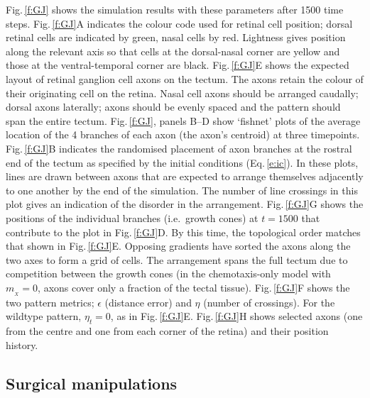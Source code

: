 \documentclass[9pt,lineno]{elife}
\begin{document}
Fig.\,\ref{f:GJ} shows the simulation results with these parameters after 1500 time steps. 
Fig.\,\ref{f:GJ}A indicates the colour code used for retinal cell position; dorsal retinal cells are indicated by green, nasal cells by red. Lightness gives position along the relevant axis so that cells at the dorsal-nasal corner are yellow and those at the ventral-temporal corner are black.
Fig.\,\ref{f:GJ}E shows the expected layout of retinal ganglion cell axons on the tectum.
The axons retain the colour of their originating cell on the retina.
Nasal cell axons should be arranged caudally; dorsal axons laterally; axons should be evenly spaced and the pattern should span the entire tectum.
Fig.\,\ref{f:GJ}, panels B--D show `fishnet' plots of the average location of the 4 branches of each axon (the axon's centroid) at three timepoints. 
Fig.\,\ref{f:GJ}B indicates the randomised placement of axon branches at the rostral end of the tectum as specified by the initial conditions (Eq.\,\ref{e:ic}).
In these plots, lines are drawn between axons that are expected to arrange themselves adjacently to one another by the end of the simulation. 
The number of line crossings in this plot gives an indication of the disorder in the arrangement.
Fig.\,\ref{f:GJ}G shows the positions of the individual branches (i.e.~growth cones) at $t=1500$ that contribute to the plot in Fig.\,\ref{f:GJ}D.
By this time, the topological order matches that shown in Fig.\,\ref{f:GJ}E.
Opposing gradients have sorted the axons along the two axes to form a grid of cells.
The arrangement spans the full tectum due to competition between the growth cones (in the chemotaxis-only model with $m_{\!_X}=0$, axons cover only a fraction of the tectal tissue).
Fig.\,\ref{f:GJ}F shows the two pattern metrics; $\epsilon$ (distance error) and $\eta$ (number of crossings).
For the wildtype pattern, $\eta_t=0$, as in Fig.\,\ref{f:GJ}E. 
Fig.\,\ref{f:GJ}H shows selected axons (one from the centre and one from each corner of the retina) and their position history.

\subsection*{Surgical manipulations}
\end{document}
